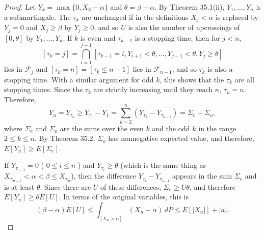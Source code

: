\begin{proof}
    Let \( Y_k = \max\{0, X_k - \alpha\} \) and \( \theta = \beta - \alpha \). By Theorem 35.1(ii), \( Y_1, \ldots, Y_n \) is a submartingale. The \( \tau_k \) are unchanged if in the definitions \( X_j < \alpha \) is replaced by \( Y_j = 0 \) and \( X_j \geq \beta \) by \( Y_j \geq 0 \), and so \( U \) is also the number of upcrossings of \([0,\theta]\) by \( Y_1, \ldots, Y_n \). If \( k \) is even and \( \tau_{k-1} \) is a stopping time, then for \( j < n \),
\[ [\tau_k = j] = \bigcap_{i=1}^{j-1} [\tau_{k-1} = i, Y_{i+1} < \theta, \ldots, Y_{j-1} < \theta, Y_j \geq \theta] \]
lies in \( \mathcal{F}_j \) and \( [\tau_k = n] = [\tau_k \leq n - 1] \) lies in \( \mathcal{F}_{n-1} \), and so \( \tau_k \) is also a stopping time. With a similar argument for odd \( k \), this shows that the \( \tau_k \) are all stopping times. Since the \( \tau_k \) are strictly increasing until they reach \( n \), \( \tau_n = n \). Therefore,
\[ Y_n = Y_{\tau_n} \geq Y_{\tau_1} - Y_1 = \sum_{k=2}^{n} (Y_{\tau_k} - Y_{\tau_{k-1}}) = \Sigma_e + \Sigma_o, \]
where \( \Sigma_e \) and \( \Sigma_o \) are the sums over the even \( k \) and the odd \( k \) in the range \( 2 \leq k \leq n \). By Theorem 35.2, \( \Sigma_o \) has nonnegative expected value, and therefore, \( E[Y_n] \geq E[\Sigma_e] \).

If \( Y_{\tau_{i-1}} = 0 \) ( \( 0 \leq i \leq n \) ) and \( Y_{\tau_i} \geq \theta \) (which is the same thing as \( X_{\tau_{2i-1}} < \alpha < \beta \leq X_{\tau_{2i}} \)), then the difference \( Y_{\tau_i} - Y_{\tau_{i-1}} \) appears in the sum \( \Sigma_e \) and is at least \( \theta \). Since there are \( U \) of these differences, \( \Sigma_e \geq U\theta \), and therefore \( E[Y_n] \geq \theta E[U] \). In terms of the original variables, this is
\[ (\beta - \alpha)E[U] \leq \int_{[X_n > \alpha]} (X_n - \alpha) \,dP \leq E[|X_n|] + |a|. \]

\end{proof}